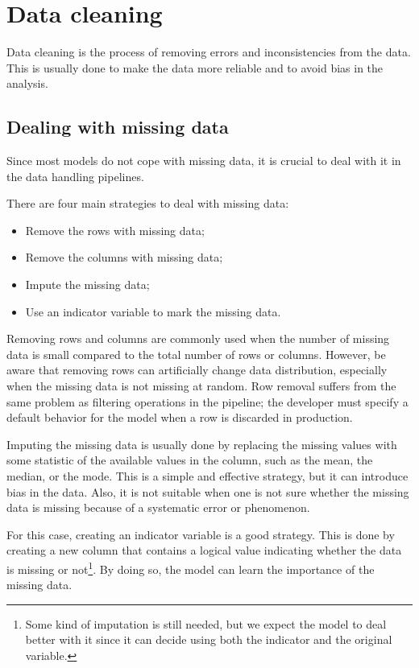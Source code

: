 
\section{Data cleaning}

Data cleaning is the process of removing errors and inconsistencies from the data.  This is
usually done to make the data more reliable and to avoid bias in the analysis.

\subsection{Dealing with missing data}

Since most models do not cope with missing data, it is crucial to deal with it in the data
handling pipelines.

There are four main strategies to deal with missing data:
\begin{itemize}
  \item Remove the rows with missing data;
  \item Remove the columns with missing data;
  \item Impute the missing data;
  \item Use an indicator variable to mark the missing data.
\end{itemize}

Removing rows and columns are commonly used when the number of missing data is small
compared to the total number of rows or columns.  However, be aware that removing rows can
artificially change data distribution, especially when the missing data is not missing at
random.  Row removal suffers from the same problem as filtering operations in the
pipeline; the developer must specify a default behavior for the model when a row is
discarded in production.

Imputing the missing data is usually done by replacing the missing values with some
statistic of the available values in the column, such as the mean, the median, or the
mode.  This is a simple and effective strategy, but it can introduce bias in the data.
Also, it is not suitable when one is not sure whether the missing data is missing because
of a systematic error or phenomenon.

For this case, creating an indicator variable is a good strategy.  This is done by creating
a new column that contains a logical value indicating whether the data is missing or
not\footnote{Some kind of imputation is still needed, but we expect the model to deal
better with it since it can decide using both the indicator and the original variable.}.
By doing so, the model can learn the importance of the missing data.

